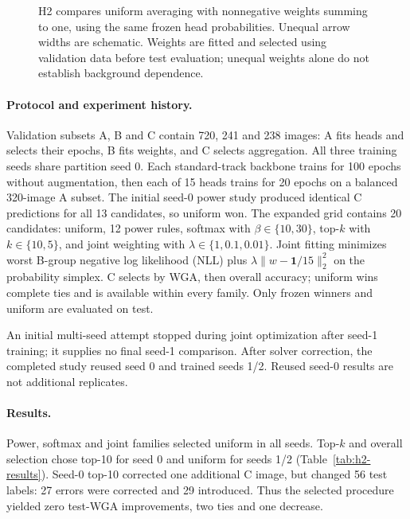 \documentclass[runningheads]{llncs}
\begin{document}
\begin{figure}[H]
\centering

\caption{H2 compares uniform averaging with nonnegative weights summing to one, using the same frozen head probabilities. Unequal arrow widths are schematic. Weights are fitted and selected using validation data before test evaluation; unequal weights alone do not establish background dependence.}
\label{fig:dpe-h2}
\end{figure}

\paragraph{Protocol and experiment history.}
Validation subsets A, B and C contain 720, 241 and 238 images: A fits heads and selects their epochs, B fits weights, and C selects aggregation. All three training seeds share partition seed 0. Each standard-track backbone trains for 100 epochs without augmentation, then each of 15 heads trains for 20 epochs on a balanced 320-image A subset. The initial seed-0 power study produced identical C predictions for all 13 candidates, so uniform won. The expanded grid contains 20 candidates: uniform, 12 power rules, softmax with $\beta\in\{10,30\}$, top-$k$ with $k\in\{10,5\}$, and joint weighting with $\lambda\in\{1,0.1,0.01\}$. Joint fitting minimizes worst B-group negative log likelihood (NLL) plus $\lambda\| w-\mathbf{1}/15\|_2^2$ on the probability simplex. C selects by WGA, then overall accuracy; uniform wins complete ties and is available within every family. Only frozen winners and uniform are evaluated on test.

An initial multi-seed attempt stopped during joint optimization after seed-1 training; it supplies no final seed-1 comparison. After solver correction, the completed study reused seed 0 and trained seeds 1/2. Reused seed-0 results are not additional replicates.

\paragraph{Results.}
Power, softmax and joint families selected uniform in all seeds. Top-$k$ and overall selection chose top-10 for seed 0 and uniform for seeds 1/2 (Table~\ref{tab:h2-results}). Seed-0 top-10 corrected one additional C image, but changed 56 test labels: 27 errors were corrected and 29 introduced. Thus the selected procedure yielded zero test-WGA improvements, two ties and one decrease.
\end{document}
